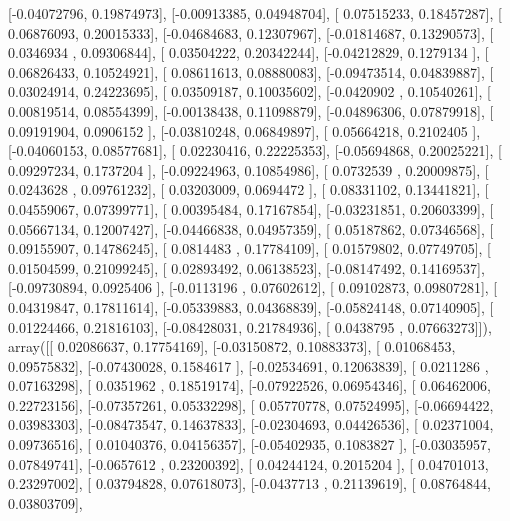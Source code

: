 \documentclass{article}
\begin{document}
       [-0.04072796,  0.19874973],
       [-0.00913385,  0.04948704],
       [ 0.07515233,  0.18457287],
       [ 0.06876093,  0.20015333],
       [-0.04684683,  0.12307967],
       [-0.01814687,  0.13290573],
       [ 0.0346934 ,  0.09306844],
       [ 0.03504222,  0.20342244],
       [-0.04212829,  0.1279134 ],
       [ 0.06826433,  0.10524921],
       [ 0.08611613,  0.08880083],
       [-0.09473514,  0.04839887],
       [ 0.03024914,  0.24223695],
       [ 0.03509187,  0.10035602],
       [-0.0420902 ,  0.10540261],
       [ 0.00819514,  0.08554399],
       [-0.00138438,  0.11098879],
       [-0.04896306,  0.07879918],
       [ 0.09191904,  0.0906152 ],
       [-0.03810248,  0.06849897],
       [ 0.05664218,  0.2102405 ],
       [-0.04060153,  0.08577681],
       [ 0.02230416,  0.22225353],
       [-0.05694868,  0.20025221],
       [ 0.09297234,  0.1737204 ],
       [-0.09224963,  0.10854986],
       [ 0.0732539 ,  0.20009875],
       [ 0.0243628 ,  0.09761232],
       [ 0.03203009,  0.0694472 ],
       [ 0.08331102,  0.13441821],
       [ 0.04559067,  0.07399771],
       [ 0.00395484,  0.17167854],
       [-0.03231851,  0.20603399],
       [ 0.05667134,  0.12007427],
       [-0.04466838,  0.04957359],
       [ 0.05187862,  0.07346568],
       [ 0.09155907,  0.14786245],
       [ 0.0814483 ,  0.17784109],
       [ 0.01579802,  0.07749705],
       [ 0.01504599,  0.21099245],
       [ 0.02893492,  0.06138523],
       [-0.08147492,  0.14169537],
       [-0.09730894,  0.0925406 ],
       [-0.0113196 ,  0.07602612],
       [ 0.09102873,  0.09807281],
       [ 0.04319847,  0.17811614],
       [-0.05339883,  0.04368839],
       [-0.05824148,  0.07140905],
       [ 0.01224466,  0.21816103],
       [-0.08428031,  0.21784936],
       [ 0.0438795 ,  0.07663273]]), array([[ 0.02086637,  0.17754169],
       [-0.03150872,  0.10883373],
       [ 0.01068453,  0.09575832],
       [-0.07430028,  0.1584617 ],
       [-0.02534691,  0.12063839],
       [ 0.0211286 ,  0.07163298],
       [ 0.0351962 ,  0.18519174],
       [-0.07922526,  0.06954346],
       [ 0.06462006,  0.22723156],
       [-0.07357261,  0.05332298],
       [ 0.05770778,  0.07524995],
       [-0.06694422,  0.03983303],
       [-0.08473547,  0.14637833],
       [-0.02304693,  0.04426536],
       [ 0.02371004,  0.09736516],
       [ 0.01040376,  0.04156357],
       [-0.05402935,  0.1083827 ],
       [-0.03035957,  0.07849741],
       [-0.0657612 ,  0.23200392],
       [ 0.04244124,  0.2015204 ],
       [ 0.04701013,  0.23297002],
       [ 0.03794828,  0.07618073],
       [-0.0437713 ,  0.21139619],
       [ 0.08764844,  0.03803709],
\end{document}

